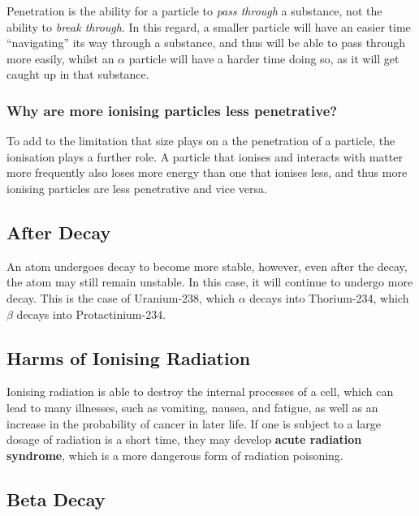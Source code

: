 \documentclass[
]{article}
\begin{document}
Penetration is the ability for a particle to \emph{pass through} a
substance, not the ability to \emph{break through}. In this regard, a
smaller particle will have an easier time ``navigating'' its way through
a substance, and thus will be able to pass through more easily, whilst
an {\(\alpha\)} particle will have a harder time doing so, as it will
get caught up in that substance.

\hypertarget{why-are-more-ionising-particles-less-penetrative}{%
\subsubsection{Why are more ionising particles less
penetrative?}\label{why-are-more-ionising-particles-less-penetrative}}

To add to the limitation that size plays on a the penetration of a
particle, the ionisation plays a further role. A particle that ionises
and interacts with matter more frequently also loses more energy than
one that ionises less, and thus more ionising particles are less
penetrative and vice versa.

\hypertarget{after-decay}{%
\subsection{After Decay}\label{after-decay}}

An atom undergoes decay to become more stable, however, even after the
decay, the atom may still remain unstable. In this case, it will
continue to undergo more decay. This is the case of Uranium-238, which
{\(\alpha\)} decays into Thorium-234, which {\(\beta\)} decays into
Protactinium-234.

\hypertarget{harms-of-ionising-radiation}{%
\subsection{Harms of Ionising
Radiation}\label{harms-of-ionising-radiation}}

Ionising radiation is able to destroy the internal processes of a cell,
which can lead to many illnesses, such as vomiting, nausea, and fatigue,
as well as an increase in the probability of cancer in later life. If
one is subject to a large dosage of radiation is a short time, they may
develop \textbf{acute radiation syndrome}, which is a more dangerous
form of radiation poisoning.

\hypertarget{beta-decay}{%
\subsection{Beta Decay}\label{beta-decay}}
\end{document}

